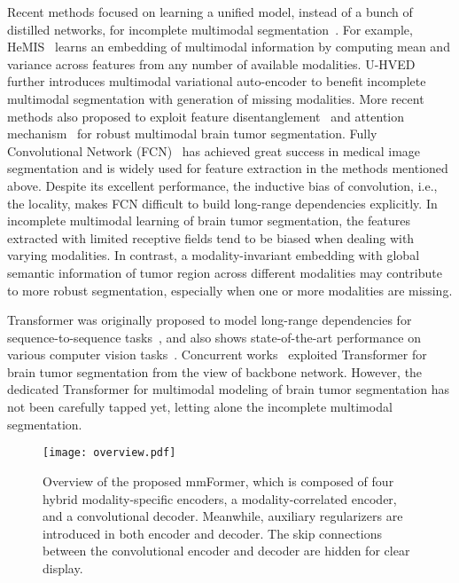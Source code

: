 \documentclass[runningheads]{llncs}
\begin{document}
Recent methods focused on learning a unified model, instead of a bunch of distilled networks, for incomplete multimodal segmentation~\cite{havaei2016hemis,shen2019brain}. For example, HeMIS~\cite{havaei2016hemis} learns an embedding of multimodal information by computing mean and variance across features from any number of available modalities. U-HVED~\cite{dorent2019hetero} further introduces multimodal variational auto-encoder to benefit incomplete multimodal segmentation with generation of missing modalities. More recent methods also proposed to exploit feature disentanglement~\cite{chen2019robust} and attention mechanism~\cite{ding2021rfnet} for robust multimodal brain tumor segmentation. Fully Convolutional Network (FCN)~\cite{long2015fully,ronneberger2015u} has achieved great success in medical image segmentation and is widely used for feature extraction in the methods mentioned above. Despite its excellent performance, the inductive bias of convolution, i.e., the locality, makes FCN difficult to build long-range dependencies explicitly. In incomplete multimodal learning of brain tumor segmentation, the features extracted with limited receptive fields tend to be biased when dealing with varying modalities. In contrast, a modality-invariant embedding with global semantic information of tumor region across different modalities may contribute to more robust segmentation, especially when one or more modalities are missing. 

Transformer was originally proposed to model long-range dependencies for sequence-to-sequence tasks~\cite{vaswani2017attention}, and also shows state-of-the-art performance on various computer vision tasks~\cite{dosovitskiy2020image}. Concurrent works~\cite{wang2021transbts,hatamizadeh2022unetr,peiris2021volumetric} exploited Transformer for brain tumor segmentation from the view of backbone network. However, the dedicated Transformer for multimodal modeling of brain tumor segmentation has not been carefully tapped yet, letting alone the incomplete multimodal segmentation. 

\begin{figure}[!tp]
\centering
\texttt{[image: overview.pdf]}	
\caption{Overview of the proposed mmFormer, which is composed of four hybrid modality-specific encoders, a modality-correlated encoder, and a convolutional decoder. Meanwhile, auxiliary regularizers are introduced in both encoder and decoder. The skip connections between the convolutional encoder and decoder are hidden for clear display.
}
\label{fig:overview}
\end{figure}
\end{document}
